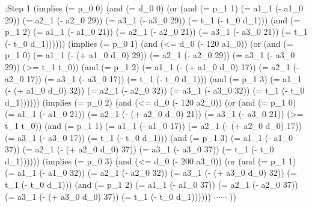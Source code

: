 \documentclass[a4paper]{article}
\begin{document}
{;Step 1\newline
 (implies (= p\_0 0)  (and (= d\_0 0)\newline
					     (or (and (= p\_1 1) (= a1\_1 (- a1\_0 29)) (= a2\_1 (- a2\_0 29)) (= a3\_1 (- a3\_0 29)) (= t\_1 (- t\_0 d\_1))) \newline
						     (and (= p\_1 2) (= a1\_1 (- a1\_0 21)) (= a2\_1 (- a2\_0 21)) (= a3\_1 (- a3\_0 21)) (= t\_1 (- t\_0 d\_1))))))\newline
							 \newline
 (implies (= p\_0 1)  (and (<= d\_0 (- 120 a1\_0))\newline
					     (or (and (= p\_1 0) (= a1\_1 (- (+ a1\_0 d\_0) 29)) (= a2\_1 (- a2\_0 29)) (= a3\_1 (- a3\_0 29)) (>= t\_1 t\_0)) \newline
						     (and (= p\_1 2) (= a1\_1 (- (+ a1\_0 d\_0) 17)) (= a2\_1 (- a2\_0 17)) (= a3\_1 (- a3\_0 17)) (= t\_1 (- t\_0 d\_1)))\newline
							 (and (= p\_1 3) (= a1\_1 (- (+ a1\_0 d\_0) 32)) (= a2\_1 (- a2\_0 32)) (= a3\_1 (- a3\_0 32)) (= t\_1 (- t\_0 d\_1))))))\newline
\newline
(implies (= p\_0 2)  (and (<= d\_0 (- 120 a2\_0))\newline
					     (or (and (= p\_1 0) (= a1\_1 (- a1\_0 21)) (= a2\_1 (- (+ a2\_0 d\_0) 21)) (= a3\_1 (- a3\_0 21)) (>= t\_1 t\_0)) \newline
						     (and (= p\_1 1) (= a1\_1 (- a1\_0 17)) (= a2\_1 (- (+ a2\_0 d\_0) 17)) (= a3\_1 (- a3\_0 17)) (= t\_1 (- t\_0 d\_1)))\newline
							 (and (= p\_1 3) (= a1\_1 (- a1\_0 37)) (= a2\_1 (- (+ a2\_0 d\_0) 37)) (= a3\_1 (- a3\_0 37)) (= t\_1 (- t\_0 d\_1))))))\newline
							 \newline
(implies (= p\_0 3)  (and (<= d\_0 (- 200 a3\_0))\newline
					     (or (and (= p\_1 1) (= a1\_1 (- a1\_0 32)) (= a2\_1 (- a2\_0 32)) (= a3\_1 (- (+ a3\_0 d\_0) 32)) (= t\_1 (- t\_0 d\_1)))\newline
							 (and (= p\_1 2) (= a1\_1 (- a1\_0 37)) (= a2\_1 (- a2\_0 37)) (= a3\_1 (- (+ a3\_0 d\_0) 37)) (= t\_1 (- t\_0 d\_1))))))\newline
$\cdots \cdots$
\newline
))
}
\selectfont

\vspace{3mm}
\end{document}
